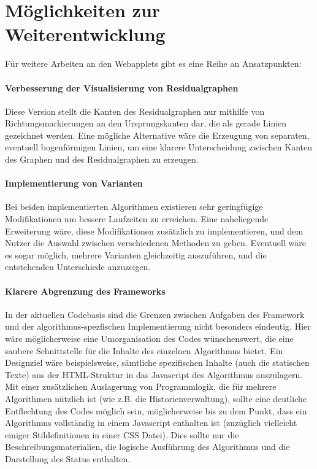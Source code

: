 \pagebreak

\section*{Möglichkeiten zur Weiterentwicklung}

Für weitere Arbeiten an den Webapplets gibt es eine Reihe an Ansatzpunkten:

\paragraph{Verbesserung der Visualisierung von Residualgraphen}
Diese Version stellt die Kanten des Residualgraphen nur mithilfe von Richtungsmarkierungen an den Ursprungskanten dar, die als gerade Linien gezeichnet werden. Eine mögliche Alternative wäre die Erzeugung von separaten, eventuell bogenförmigen Linien, um eine klarere Unterscheidung zwischen Kanten des Graphen und des Residualgraphen zu erzeugen.

\paragraph{Implementierung von Varianten}
Bei beiden implementierten Algorithmen existieren sehr geringfügige Modifikationen um bessere Laufzeiten zu erreichen. Eine naheliegende Erweiterung wäre, diese Modifikationen zusätzlich zu implementieren, und dem Nutzer die Auswahl zwischen verschiedenen Methoden zu geben. Eventuell wäre es sogar möglich, mehrere Varianten gleichzeitig auszuführen, und die entstehenden Unterschiede anzuzeigen.

\paragraph{Klarere Abgrenzung des Frameworks}
In der aktuellen Codebasis sind die Grenzen zwischen Aufgaben des Framework und der algorithmus-spezfischen Implementierung nicht besonders eindeutig. Hier wäre möglicherweise eine Umorganisation des Codes wünschenswert, die eine saubere Schnittstelle für die Inhalte des einzelnen Algorithmus bietet. Ein Designziel wäre beispielsweise, sämtliche spezifischen Inhalte (auch die statischen Texte) aus der HTML-Struktur in das Javascript des Algorithmus auszulagern. Mit einer zusätzlichen Auslagerung von Programmlogik, die für mehrere Algorithmen nützlich ist (wie z.B. die Historienverwaltung), sollte eine deutliche Entflechtung des Codes möglich sein, möglicherweise bis zu dem Punkt, dass ein Algorithmus vollständig in einem Javascript enthalten ist (zuzüglich vielleicht einiger Stildefinitionen in einer CSS Datei). Dies sollte nur die Beschreibungsmaterialien, die logische Ausführung des Algorithmus und die Darstellung des Status enthalten.

